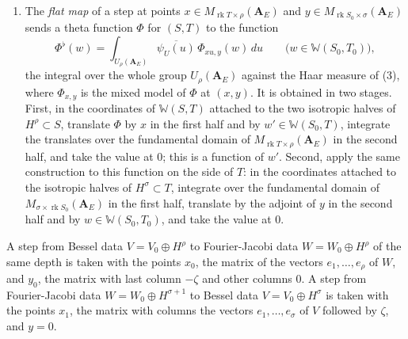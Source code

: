 \begin{definition}
\begin{enumerate}
  Haar measures with fundamental domains of volume $1$ for the rational points
  of $M_{\operatorname{rk}T\times\rho}(\mathbf A_E)$,
  $M_{\sigma\times\operatorname{rk}S_0}(\mathbf A_E)$ and $U_\rho(\mathbf A_E)$.
  For a function $G$ on $U(T)(\mathbf A)$ and a theta function $\Phi$ for
  $(S,T)$, $\theta_\Phi(G)$ is the theta lift of $G$ to $U(S)(\mathbf A)$ by
  $\omega$ (Definition~\ref{th-weil-datum}(4)).
\item The \emph{flat map} of a step at points
  $x\in M_{\operatorname{rk}T\times\rho}(\mathbf A_E)$ and
  $y\in M_{\operatorname{rk}S_0\times\sigma}(\mathbf A_E)$ sends a theta
  function $\Phi$ for $(S,T)$ to the function
  \[
  \Phi^\flat(w)=\int_{U_\rho(\mathbf A_E)}\overline{\psi_U(u)}\,
  \Phi_{xu,y}(w)\,du\qquad\bigl(w\in\mathbb W(S_0,T_0)\bigr),
  \]
  the integral over the whole group $U_\rho(\mathbf A_E)$ against the Haar
  measure of (3), where $\Phi_{x,y}$ is the mixed model of $\Phi$ at $(x,y)$. It is obtained in
  two stages. First, in the coordinates of $\mathbb W(S,T)$ attached to the two
  isotropic halves of $H^\rho\subset S$, translate $\Phi$ by $x$ in the first
  half and by $w'\in\mathbb W(S_0,T)$, integrate the translates over the
  fundamental domain of $M_{\operatorname{rk}T\times\rho}(\mathbf A_E)$ in the
  second half, and take the value at $0$; this is a function of $w'$. Second,
  apply the same construction to this function on the side of $T$: in the
  coordinates attached to the isotropic halves of $H^\sigma\subset T$,
  integrate over the fundamental domain of
  $M_{\sigma\times\operatorname{rk}S_0}(\mathbf A_E)$ in the first half,
  translate by the adjoint of $y$ in the second half and by
  $w\in\mathbb W(S_0,T_0)$, and take the value at $0$.
\end{enumerate}
A step from Bessel data $V=V_0\oplus H^\rho$ to Fourier-Jacobi data
$W=W_0\oplus H^\rho$ of the same depth is taken with the points $x_0$, the
matrix of the vectors $e_1,\ldots,e_\rho$ of $W$, and $y_0$, the matrix with
last column $-\zeta$ and other columns $0$. A step from Fourier-Jacobi data
$W=W_0\oplus H^{\sigma+1}$ to Bessel data $V=V_0\oplus H^\sigma$ is taken with
the points $x_1$, the matrix with columns the vectors $e_1,\ldots,e_\sigma$ of
$V$ followed by $\zeta$, and $y=0$.
\end{definition}

